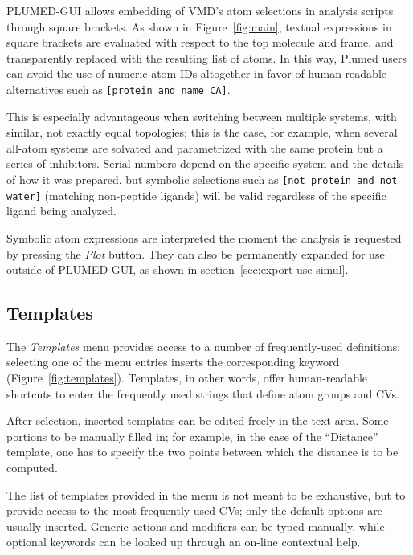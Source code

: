 \documentclass[preprint,12pt]{elsarticle}
\begin{document}
PLUMED-GUI allows  embedding of VMD's atom selections in analysis scripts
through  square brackets. As shown in Figure~\ref{fig:main},
textual expressions in square brackets are evaluated with respect to
the top molecule and frame, and transparently replaced with the
resulting list of atoms. In this way, Plumed users can 
avoid the use of numeric atom IDs altogether in favor of human-readable
alternatives such as \texttt{[protein and name CA]}.

This is especially advantageous when switching between multiple
systems, with similar, not exactly equal topologies; this is the case,
for example, when several all-atom systems are solvated and
parametrized with the same protein but a series of inhibitors.  Serial
numbers  depend on the specific system and the details of how it was prepared, but
symbolic selections such as \texttt{[not protein and not water]}
(matching non-peptide ligands) will be valid
regardless of the specific ligand being analyzed.

Symbolic atom expressions are interpreted  the moment the
analysis is requested by pressing the \emph{Plot} button. They can also
be permanently expanded for use outside of PLUMED-GUI, as shown in
section~\ref{sec:export-use-simul}.



\subsection{Templates}

The \emph{Templates} menu provides access to a number of frequently-used
definitions; selecting one of the menu entries inserts the
corresponding keyword (Figure~\ref{fig:templates}). Templates, in
other words, offer human-readable shortcuts to enter the frequently used
strings that define atom groups and CVs.

After selection, inserted templates can be edited freely in the text
area.  Some portions to be manually filled in; for example, in the
case of the ``Distance'' template, one has to specify the two points
between which the distance is to be computed.

The list of templates provided in the menu is not meant to be
exhaustive, but to provide access to the most frequently-used CVs;
only the default options are usually inserted. Generic actions and
modifiers can be typed manually, while optional keywords can be looked
up through an on-line contextual help.
\end{document}
